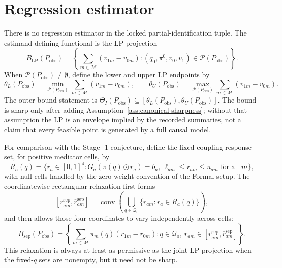 \documentclass[11pt]{article}
\theoremstyle{definition}
\theoremstyle{plain}
\theoremstyle{remark}
\begin{document}
\section{Regression estimator}
There is no regression estimator in the locked partial-identification tuple.
The estimand-defining functional is the LP projection
\[
  B_{\mathrm{LP}}(P_{\mathrm{obs}})
  =
  \left\{\sum_{m\in\mathcal M}(v_{1m}-v_{0m}):
     (q_0,\pi^0,v_0,v_1)\in\mathcal P(P_{\mathrm{obs}})
  \right\}.
\]
When \(\mathcal P(P_{\mathrm{obs}})\neq\emptyset\), define the lower and upper
LP endpoints by
\[
  \theta_L(P_{\mathrm{obs}})
   =\min_{\mathcal P(P_{\mathrm{obs}})}
      \sum_{m\in\mathcal M}(v_{1m}-v_{0m}),\qquad
  \theta_U(P_{\mathrm{obs}})
   =\max_{\mathcal P(P_{\mathrm{obs}})}
      \sum_{m\in\mathcal M}(v_{1m}-v_{0m}).
\]
The outer-bound statement is
\(\Theta_I(P_{\mathrm{obs}})\subseteq
[\theta_L(P_{\mathrm{obs}}),\theta_U(P_{\mathrm{obs}})]\).  The bound is
sharp only after adding Assumption~\ref{ass:canonical-sharpness}; without that
assumption the LP is an envelope implied by the recorded summaries, not a
claim that every feasible point is generated by a full causal model.

For comparison with the Stage -1 conjecture, define the fixed-coupling response
set, for positive mediator cells, by
\[
  R_a(q)=
  \{r_a\in[0,1]^4:
      G_a(\pi(q)\odot r_a)=b_a,\ 
      \ell_{am}\le r_{am}\le u_{am}\text{ for all }m\},
\]
with null cells handled by the zero-weight convention of the Formal setup.
The coordinatewise rectangular relaxation first forms
\[
  [\underline r^{\mathrm{sep}}_{am},\overline r^{\mathrm{sep}}_{am}]
  =
  \operatorname{conv}\left(
    \bigcup_{q\in\mathcal Q_0}
      \{r_{am}:r_a\in R_a(q)\}
  \right),
\]
and then allows those four coordinates to vary independently across cells:
\[
  B_{\mathrm{sep}}(P_{\mathrm{obs}})
  =
  \left\{
  \sum_{m\in\mathcal M}\pi_m(q)(r_{1m}-r_{0m}):
  q\in\mathcal Q_0,\ 
  r_{am}\in
  [\underline r^{\mathrm{sep}}_{am},\overline r^{\mathrm{sep}}_{am}]
  \right\}.
\]
This relaxation is always at least as permissive as the joint LP projection
when the fixed-\(q\) sets are nonempty, but it need not be sharp.
\end{document}
